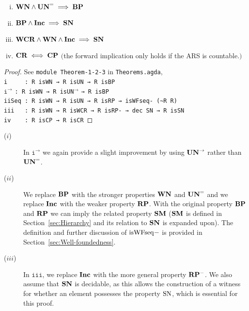 \begin{theorem} \hfill
  \begin{enumerate}[i)]
    \item $\mathbf{WN} \land \mathbf{UN}^{=} \implies \mathbf{BP}$
    \item $\mathbf{BP} \land \mathbf{Inc} \implies \mathbf{SN}$
    \item $\mathbf{WCR} \land \mathbf{WN} \land \mathbf{Inc} \implies \mathbf{SN}$
    \item $\mathbf{CR} \iff \mathbf{CP}$ $($the forward implication only holds if the ARS is countable.$)$
  \end{enumerate}
\end{theorem}

\begin{proof}
    See \texttt{module Theorem-1-2-3} in \texttt{Theorems.agda},\\
    \verb|i     : R isWN → R isUN → R isBP|\\
    $\mathtt{i^\to}$\hspace{5mm} \verb|: R isWN → R |\texttt{isUN}$^{\to}$ \verb|→ R isBP|\\
    \verb|iiSeq : R isWN → R isUN → R isRP → isWFseq- (~R R)|\\
    \verb|iii   : R isWN → R isWCR → R isRP- → dec SN → R isSN|\\
    \verb|iv    : R isCP → R isCR|
\end{proof}
\begin{remark} \hfill
  \begin{description}
    \item[($i$)] In $\mathtt{i^\to}$ we again provide a slight improvement by using $\mathbf{UN}^{\to}$ rather than $\mathbf{UN}^{=}$.
    \item[($ii$)] We replace $\mathbf{BP}$ with the stronger properties $\mathbf{WN}$ and $\mathbf{UN}^{=}$ and we replace $\mathbf{Inc}$ with the weaker property $\mathbf{RP}$. With the original property $\mathbf{BP}$ and $\mathbf{RP}$ we can imply the related property $\mathbf{SM}$ ($\mathbf{SM}$ is defined in Section~\ref{sec:Hierarchy} and its relation to $\mathbf{SN}$ is expanded upon). The definition and further discussion of $\mathrm{isWFseq}{-}$ is provided in Section~\ref{sec:Well-foundedness}.
    \item[($iii$)] In $\mathtt{iii}$, we replace $\mathbf{Inc}$ with the more general property $\mathbf{RP^{-}}$. We also assume that $\mathbf{SN}$ is decidable, as this allows the construction of a witness for whether an element possesses the property $\mathrm{SN}$, which is essential for this proof.
  \end{description}
\end{remark}
